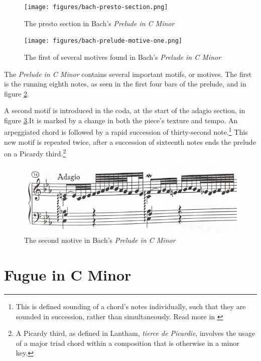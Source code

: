 \begin{figure}
    \centering
    \texttt{[image: figures/bach-presto-section.png]}
    \caption{The presto section in Bach's \textit{Prelude in C Minor}}
    \label{fig:bach-presto-section}
\end{figure}

\begin{figure}
    \centering
    \texttt{[image: figures/bach-prelude-motive-one.png]}
    \caption{The first of several motives found in Bach's \textit{Prelude in C Minor}}
    \label{fig:bach-first-motive}
\end{figure}

The \textit{Prelude in C Minor} contains several important motifs, or motives. The first is the running eighth notes, as seen in the first four bars of the prelude, and in figure \ref{fig:bach-first-motive}\autocite{Henle_2009}.

A second motif is introduced in the coda, at the start of the adagio section, in figure \ref{fig:bach-second-motive}\autocite{Henle_2009}.It is marked by a change in both the piece's texture and tempo. An arpeggiated chord is followed by a rapid succession of thirty-second note.\footnote{This is defined sounding of a chord's notes individually, such that they are sounded in succession, rather than simultaneously. Read more in \cite{Arpeggio_2001}} This new motif is repeated twice, after a succession of sixteenth notes ends the prelude on a Picardy third.\footnote{A Picardy third, as defined in Lantham, \textit{tierce de Picardie}, involves the usage of a major triad chord within a composition that is otherwise in a minor key.}
\begin{figure}
    \centering
    \includegraphics[width=\textwidth]{figures/bach-prelude-second-motive.png}
    \caption{The second motive in Bach's \textit{Prelude in C Minor}}
    \label{fig:bach-second-motive}
\end{figure}

\section{Fugue in C Minor}

